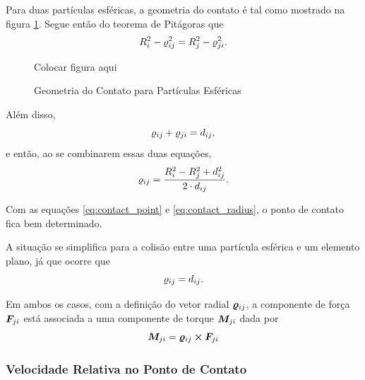 Para duas partículas esféricas, a geometria do contato é tal como mostrado na figura \ref{fig:contact_geometry}. Segue então do teorema de Pitágoras que
\begin{equation*}
	{R}_{i}^2 - {\varrho}_{i j}^2 = {R}_{j}^2 - {\varrho}_{j i}^2.
\end{equation*}

\begin{figure}[h]
	\caption{Geometria do Contato para Partículas Esféricas}
	\begin{center}
		\alert{Colocar figura aqui}
	\end{center}
	\label{fig:contact_geometry}
\end{figure}

Além disso,
\begin{equation*}
	{\varrho}_{i j} + {\varrho}_{j i} = {d}_{i j},
\end{equation*}
e então, ao se combinarem essas duas equações,
\begin{equation} \label{eq:contact_radius}
	{\varrho}_{i j} = \dfrac{{R}_{i}^2 - {R}_{j}^2 + {d}_{i j}^2}{2\cdot{d}_{i j}}.
\end{equation}

Com as equações \eqref{eq:contact_point} e \eqref{eq:contact_radius}, o ponto de contato fica bem determinado.

A situação se simplifica para a colisão entre uma partícula esférica e um elemento plano, já que ocorre que
\begin{equation*}
	{\varrho}_{i j} = {d}_{i j}.
\end{equation*}

Em ambos os casos, com a definição do vetor radial \({\bm{\varrho}}_{i j}\), a componente de força \({\bm{F}}_{j i}\) está associada a uma componente de torque \({\bm{M}}_{j i}\) dada por
\begin{equation*}
	{\bm{M}}_{j i} = {\bm{\varrho}}_{i j}\cross{\bm{F}}_{j i}
\end{equation*}

\subsubsection*{Velocidade Relativa no Ponto de Contato}

